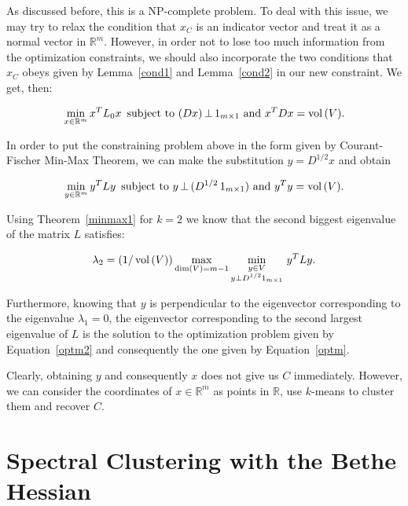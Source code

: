 As discussed before, this is a NP-complete problem.
To deal with this issue, we may try to relax the condition that $x_C$ is an indicator vector and treat it as a normal vector in $\mathbb R^{m }$.
However, in order not to lose too much information from the optimization constraints, we should also incorporate the two conditions that $x_C$ obeys given by Lemma~\ref{cond1} and Lemma~\vref{cond2} in our new constraint. We get, then:

\begin{equation}
   \min_{x \in \mathbb R^{m }} {x}^TL_0{x}\,\text{ subject to } (Dx)\, \bot \, 1_{m \times 1}  \text{ and } x^T D x = \operatorname*{vol\,} (V).
\end{equation}

In order to put the constraining problem above in the form given by Courant-Fischer Min-Max Theorem, we can make the substitution $y = D^{1/2}x$ and obtain

\begin{equation} \label{optm}
   \min_{y \in \mathbb R^{m }} y^TLy \,\text{ subject to } y \, \bot \, (D^{1/2} \,1_{m \times 1}) \text{ and } y^T y = \operatorname*{vol\,} (V).
\end{equation}

Using Theorem~\vref{minmax1} for $k = 2$ we know that the second biggest eigenvalue of the matrix $L$ satisfies:

\begin{equation}\label{optm2}
   \lambda_2 = \left( 1/\operatorname*{vol\,}(V) \right) \max_{\dim (V) = m-1} \min_{\substack{y \in V \\ y \bot D^{1/2}1_{m \times 1}}} \, y^TLy.
\end{equation}

Furthermore, knowing that $y$ is perpendicular to the eigenvector corresponding to the eigenvalue $\lambda_1 = 0$, the eigenvector corresponding to the second largest eigenvalue of $L$ is the solution to the optimization problem given by Equation~\ref{optm2} and consequently the one given by Equation~\ref{optm}.

Clearly, obtaining $y$ and consequently $x$ does not give us $C$ immediately.
However, we can consider the coordinates of $x \in \mathbb R^{m }$ as points in $\mathbb R$, use $k$-means to cluster them and recover $C$.

\chapter{Spectral Clustering with the Bethe Hessian}

